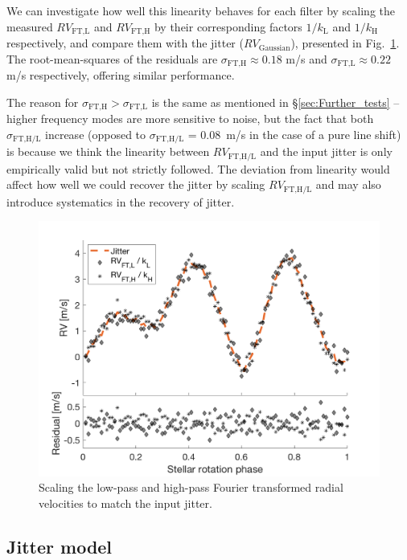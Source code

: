 We can investigate how well this linearity behaves for each filter by scaling the measured $RV_\text{FT,L}$ and $RV_\text{FT,H}$ by their corresponding factors $1/k_\text{L}$ and $1/k_\text{H}$ respectively, and compare them with the jitter ($RV_\text{Gaussian}$), presented in Fig.~\ref{fig:scaling_RV_FT}. The root-mean-squares of the residuals are $\sigma_\text{FT,H} \approx 0.18$ m/s and $\sigma_\text{FT,L} \approx 0.22$ m/s respectively, offering similar performance.  

The reason for $\sigma_\text{FT,H}>\sigma_\text{FT,L}$ is the same as mentioned in \S\ref{sec:Further_tests} -- higher frequency modes are more sensitive to noise, but the fact that both $\sigma_\text{FT,H/L}$ increase (opposed to $\sigma_\text{FT,H/L}$ = 0.08~m/s in the case of a pure line shift) is because we think the linearity between $RV_\text{FT,H/L}$ and the input jitter is only empirically valid but not strictly followed. The deviation from linearity would affect how well we could recover the jitter by scaling $RV_\text{FT,H/L}$ and may also introduce systematics in the recovery of jitter. 

\begin{figure}[tbp]
\centering
\includegraphics[width = 0.7 \linewidth]
{./Figures/Methods/5-JITTER_ONLY_4.png}
\caption[Scaling the low-pass and high-pass Fourier transformed radial velocities]
{Scaling the low-pass and high-pass Fourier transformed radial velocities to match the input jitter.}
\label{fig:scaling_RV_FT}
\end{figure} 

\subsection{Jitter model}
\label{subsec:Jitter_model}

